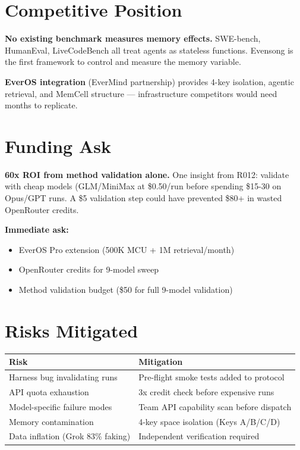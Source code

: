 \documentclass[11pt, a4paper]{article}
\begin{document}
\section{Competitive Position}

\textbf{No existing benchmark measures memory effects.} SWE-bench, HumanEval, LiveCodeBench all treat agents as stateless functions. Evensong is the first framework to control and measure the memory variable.

\textbf{EverOS integration} (EverMind partnership) provides 4-key isolation, agentic retrieval, and MemCell structure — infrastructure competitors would need months to replicate.

\section{Funding Ask}

\textbf{60x ROI from method validation alone.} One insight from R012: validate with cheap models (GLM/MiniMax at \$0.50/run before spending \$15-30 on Opus/GPT runs. A \$5 validation step could have prevented \$80+ in wasted OpenRouter credits.

\textbf{Immediate ask:}
\begin{itemize}
  \item EverOS Pro extension (500K MCU + 1M retrieval/month)
  \item OpenRouter credits for 9-model sweep
  \item Method validation budget (\$50 for full 9-model validation)
\end{itemize}

\section{Risks Mitigated}

\begin{tabular}{l|l}
Risk & Mitigation\\\hline
Harness bug invalidating runs & Pre-flight smoke tests added to protocol\\
API quota exhaustion & 3x credit check before expensive runs\\
Model-specific failure modes & Team API capability scan before dispatch\\
Memory contamination & 4-key space isolation (Keys A/B/C/D)\\
Data inflation (Grok 83\% faking) & Independent verification required\\
\end{tabular}
\end{document}
